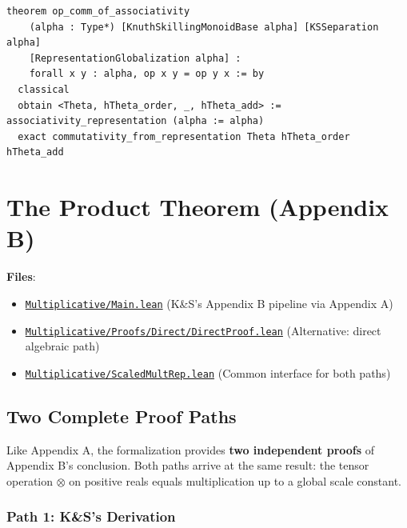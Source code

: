 \documentclass[11pt]{article}
\theoremstyle{definition}
\theoremstyle{remark}
\begin{document}
\begin{lstlisting}[caption={Commutativity from representation}]
theorem op_comm_of_associativity
    (alpha : Type*) [KnuthSkillingMonoidBase alpha] [KSSeparation alpha]
    [RepresentationGlobalization alpha] :
    forall x y : alpha, op x y = op y x := by
  classical
  obtain <Theta, hTheta_order, _, hTheta_add> := associativity_representation (alpha := alpha)
  exact commutativity_from_representation Theta hTheta_order hTheta_add
\end{lstlisting}

\section{The Product Theorem (Appendix B)}
\label{sec:product}

\textbf{Files}:
\begin{itemize}
\item \href{https://github.com/zariuq/ks-foundations-of-inference/blob/main/KnuthSkilling/Multiplicative/Main.lean}{\texttt{Multiplicative/Main.lean}} (K\&S's Appendix B pipeline via Appendix A)
\item \href{https://github.com/zariuq/ks-foundations-of-inference/blob/main/KnuthSkilling/Multiplicative/Proofs/Direct/DirectProof.lean}{\texttt{Multiplicative/Proofs/Direct/DirectProof.lean}} (Alternative: direct algebraic path)
\item \href{https://github.com/zariuq/ks-foundations-of-inference/blob/main/KnuthSkilling/Multiplicative/ScaledMultRep.lean}{\texttt{Multiplicative/ScaledMultRep.lean}} (Common interface for both paths)
\end{itemize}

\subsection{Two Complete Proof Paths}

Like Appendix A, the formalization provides \textbf{two independent proofs} of Appendix B's conclusion.
Both paths arrive at the same result: the tensor operation $\otimes$ on positive reals equals
multiplication up to a global scale constant.

\subsubsection{Path 1: K\&S's Derivation}
\end{document}
